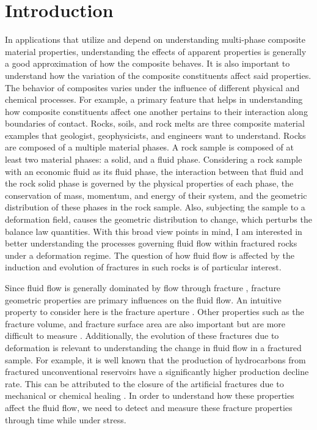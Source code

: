 \documentclass{edger}
\begin{document}
\section{Introduction}
In applications that utilize and depend on understanding multi-phase composite material properties, understanding the effects of apparent properties is generally a good approximation of how the composite behaves. It is also important to understand how the variation of the composite constituents affect said properties. The behavior of composites varies under the influence of different physical and chemical processes. For example, a primary feature that helps in understanding how composite constituents affect one another pertains to their interaction along boundaries of contact. Rocks, soils, and rock melts are three composite material examples that geologist, geophysicists, and engineers want to understand. Rocks are composed of a multiple material phases. A rock sample is composed of at least two material phases: a solid, and a fluid phase. Considering a rock sample with an economic fluid as its fluid phase, the interaction between that fluid and the rock solid phase is governed by the physical properties of each phase, the conservation of mass, momentum, and energy of their system, and the geometric distribution of these phases in the rock sample. Also, subjecting the sample to a deformation field, causes the geometric distribution to change, which perturbs the balance law quantities. With this broad view points in mind, I am interested in better understanding the processes governing fluid flow within fractured rocks under a deformation regime. The question of how fluid flow is affected by the induction and evolution of fractures in such rocks is of particular interest. 


Since fluid flow is generally dominated by flow through fracture \citep{Zoback2007} , fracture geometric properties are primary influences on the fluid flow. An intuitive property to consider here is the fracture aperture \citep{Zimmerman1996}. Other properties such as the fracture volume, and fracture surface area are also important but are more difficult to measure \citep{Zhao2020}.  Additionally, the evolution of these fractures due to deformation is relevant to understanding the change in fluid flow in a fractured sample. For example, it is well known that the production of hydrocarbons from fractured unconventional reservoirs have a significantly higher production decline rate. This can be attributed to the closure of the artificial fractures due to mechanical or chemical healing \citep{Kleinberg2018} . In order to understand how these properties affect the fluid flow, we need to detect and measure these fracture properties through time while under stress.
\end{document}
